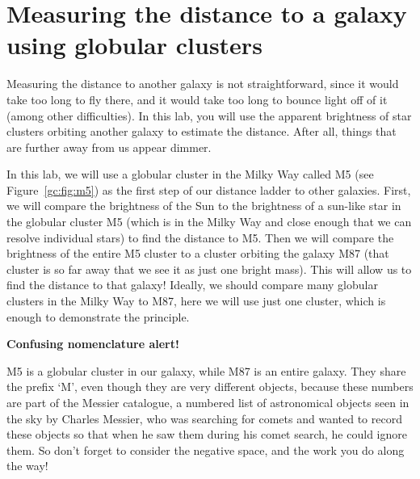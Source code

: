 \chapter{Measuring the distance to a galaxy using globular clusters}



Measuring the distance to another galaxy is not straightforward, since it would take too long to fly there, and it would take too long to bounce light off of it (among other difficulties). In this lab, you will use the apparent brightness of star clusters orbiting another galaxy to estimate the distance. After all, things that are further away from us appear dimmer.

In this lab, we will use a globular cluster in the Milky Way called M5 (see Figure~\ref{gc:fig:m5}) as the first step of our distance
ladder to other galaxies. First, we will compare the brightness of the Sun to the brightness of a sun-like star in the globular cluster M5 (which is in the Milky Way and close enough that we can resolve individual stars) to find the distance to M5. Then we will compare the brightness of the entire M5 cluster to a cluster orbiting the galaxy M87 (that cluster is so far away that we see it as just one bright mass). This will allow us to find the distance to that galaxy! Ideally, we should compare many globular clusters in the Milky Way to
M87, here we will use just one cluster, which is enough to demonstrate the principle.

\begin{framed}
	\textbf{Confusing nomenclature alert!}
	
	M5 is a globular cluster in our galaxy, while M87 is an entire galaxy. They share the prefix `M', even though they are very different objects, because these numbers are part of the Messier catalogue, a numbered list of astronomical objects seen in the sky by Charles Messier, who was searching for comets and wanted to record these objects so that when he saw them during his comet search, he could ignore them. So don't forget to consider the negative space, and the work you do along the way!
\end{framed}

